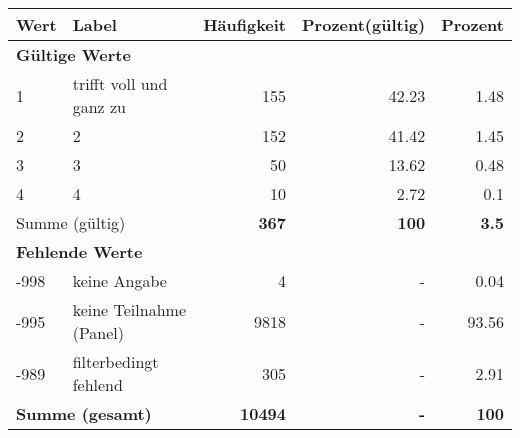      \begin{longtable}{lXrrr}
     \toprule
     \textbf{Wert} & \textbf{Label} & \textbf{Häufigkeit} & \textbf{Prozent(gültig)} & \textbf{Prozent} \\
     \endhead
     \midrule
     \multicolumn{5}{l}{\textbf{Gültige Werte}}\\

     1 &
     \multicolumn{1}{X}{ trifft voll und ganz zu   } &


       \num{155} &
       \num[round-mode=places,round-precision=2]{42,23} &
         \num[round-mode=places,round-precision=2]{1,48} \\

     2 &
     \multicolumn{1}{X}{ 2   } &


       \num{152} &
       \num[round-mode=places,round-precision=2]{41,42} &
         \num[round-mode=places,round-precision=2]{1,45} \\

     3 &
     \multicolumn{1}{X}{ 3   } &


       \num{50} &
       \num[round-mode=places,round-precision=2]{13,62} &
         \num[round-mode=places,round-precision=2]{0,48} \\

     4 &
     \multicolumn{1}{X}{ 4   } &


       \num{10} &
       \num[round-mode=places,round-precision=2]{2,72} &
         \num[round-mode=places,round-precision=2]{0,1} \\
     \midrule
     \multicolumn{2}{l}{Summe (gültig)} &
       \textbf{\num{367}} &
     \textbf{100} &
       \textbf{\num[round-mode=places,round-precision=2]{3,5}} \\
     \multicolumn{5}{l}{\textbf{Fehlende Werte}}\\
       -998 &
       keine Angabe &
         \num{4} &
        - &
         \num[round-mode=places,round-precision=2]{0,04} \\
       -995 &
       keine Teilnahme (Panel) &
         \num{9818} &
        - &
         \num[round-mode=places,round-precision=2]{93,56} \\
       -989 &
       filterbedingt fehlend &
         \num{305} &
        - &
         \num[round-mode=places,round-precision=2]{2,91} \\
     \midrule
     \multicolumn{2}{l}{\textbf{Summe (gesamt)}} &
          \textbf{\num{10494}} &
        \textbf{-} &
        \textbf{100} \\
     \bottomrule
     \end{longtable}
     
